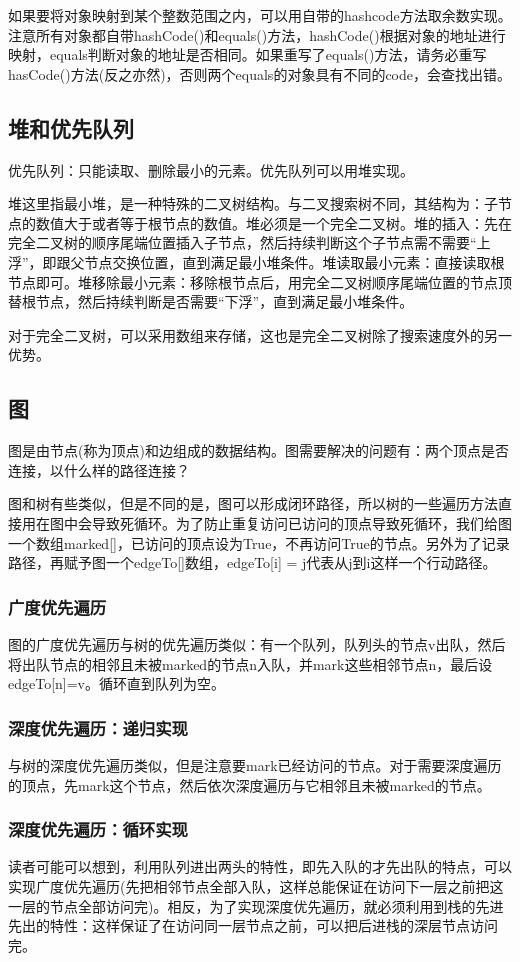 \documentclass{article}
\begin{document}
	如果要将对象映射到某个整数范围之内，可以用自带的hashcode方法取余数实现。注意所有对象都自带hashCode()和equals()方法，hashCode()根据对象的地址进行映射，equals判断对象的地址是否相同。如果重写了equals()方法，请务必重写hasCode()方法(反之亦然)，否则两个equals的对象具有不同的code，会查找出错。
	\subsection{堆和优先队列}
	优先队列：只能读取、删除最小的元素。优先队列可以用堆实现。
	
	堆这里指最小堆，是一种特殊的二叉树结构。与二叉搜索树不同，其结构为：子节点的数值大于或者等于根节点的数值。堆必须是一个完全二叉树。堆的插入：先在完全二叉树的顺序尾端位置插入子节点，然后持续判断这个子节点需不需要“上浮”，即跟父节点交换位置，直到满足最小堆条件。堆读取最小元素：直接读取根节点即可。堆移除最小元素：移除根节点后，用完全二叉树顺序尾端位置的节点顶替根节点，然后持续判断是否需要“下浮”，直到满足最小堆条件。
	
	对于完全二叉树，可以采用数组来存储，这也是完全二叉树除了搜索速度外的另一优势。
	\subsection{图}
	图是由节点(称为顶点)和边组成的数据结构。图需要解决的问题有：两个顶点是否连接，以什么样的路径连接？
	
	图和树有些类似，但是不同的是，图可以形成闭环路径，所以树的一些遍历方法直接用在图中会导致死循环。为了防止重复访问已访问的顶点导致死循环，我们给图一个数组marked[]，已访问的顶点设为True，不再访问True的节点。另外为了记录路径，再赋予图一个edgeTo[]数组，edgeTo[i] = j代表从j到i这样一个行动路径。
	\subsubsection{广度优先遍历}
	图的广度优先遍历与树的优先遍历类似：有一个队列，队列头的节点v出队，然后将出队节点的相邻且未被marked的节点n入队，并mark这些相邻节点n，最后设edgeTo[n]=v。循环直到队列为空。
	\subsubsection{深度优先遍历：递归实现}
	与树的深度优先遍历类似，但是注意要mark已经访问的节点。对于需要深度遍历的顶点，先mark这个节点，然后依次深度遍历与它相邻且未被marked的节点。
	\subsubsection{深度优先遍历：循环实现}
	读者可能可以想到，利用队列进出两头的特性，即先入队的才先出队的特点，可以实现广度优先遍历(先把相邻节点全部入队，这样总能保证在访问下一层之前把这一层的节点全部访问完)。相反，为了实现深度优先遍历，就必须利用到栈的先进先出的特性：这样保证了在访问同一层节点之前，可以把后进栈的深层节点访问完。
	
\end{document}
